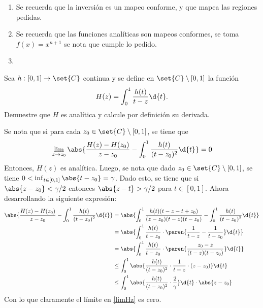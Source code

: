 \documentclass{homework}
\begin{document}
\begin{sol}
    \begin{enumerate}
        \item Se recuerda que la inversión es un mapeo conforme, y que mapea las regiones pedidas.
        \item Se recuerda que las funciones analíticas son mapeos conformes, se toma \(f(x)=x^{n+1}\) se nota que cumple lo pedido.
        \item 
    \end{enumerate}
\end{sol}

\begin{prob}
    Sea \(h:[0,1]\rightarrow\set{C}\) continua y se define en \(\set{C}\setminus[0,1]\) la función
    \[H(z)=\int_0^1\frac{h(t)}{t-z}\d{t}.\]
    Demuestre que \(H\) es analítica y calcule por definición su derivada.
\end{prob}

\begin{sol}
    Se nota que si para cada \(z_0\in\set{C}\setminus[0,1]\), se tiene que
    \begin{equation}
        \lim_{z\rightarrow z_0}\abs{\frac{H(z)-H(z_0)}{z-z_0}-\int_0^1\frac{h(t)}{(t-z_0)^2}\d{t}}=0\label{limHz}
    \end{equation}
    Entonces, \(H(z)\) es analítica. Luego, se nota que dado \(z_0\in\set{C}\setminus[0,1]\), se tiene \(0<\inf_{t\in[0,1]}\abs{t-z_0}=\gamma\). Dado esto, se tiene que si \(\abs{z-z_0}<\gamma/2\) entonces \(\abs{z-t}>\gamma/2\) para \(t\in[0,1]\). Ahora desarrollando la siguiente expresión:
    \begin{align*}
        \abs{\frac{H(z)-H(z_0)}{z-z_0}-\int_0^1\frac{h(t)}{(t-z_0)^2}\d{t}}&=\abs{\int_0^1\frac{h(t)(t-z-t+z_0)}{(z-z_0)(t-z)(t-z_0)}-\int_0^1\frac{h(t)}{(t-z_0)^2}\d{t}}\\
        &=\abs{\int_0^1\frac{h(t)}{t-z_0}\cdot\paren{\frac1{t-z}-\frac1{t-z_0}}\d{t}}\\
        &=\abs{\int_0^1\frac{h(t)}{t-z_0}\cdot\paren{\frac{z_0-z}{(t-z)(t-z_0)}}\d{t}}\\
        &\leq\int_0^1\abs{\frac{h(t)}{(t-z_0)^2}\cdot\frac1{t-z}\cdot(z-z_0)}\d{t}\\
        &\leq\int_0^1\abs{\frac{h(t)}{(t-z_0)^2}\cdot\frac2\gamma}\d{t}\cdot\abs{z-z_0}
    \end{align*}
    Con lo que claramente el límite en \eqref{limHz} es cero.
\end{sol}
\end{document}
